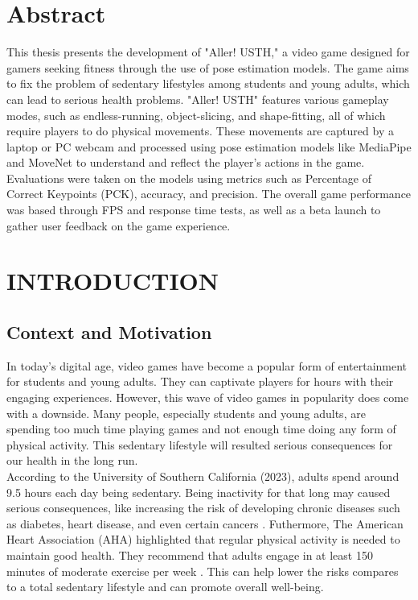 \documentclass[12pt]{article}
\begin{document}
\listoftables
{}
\clearpage

\listoffigures
{}
\clearpage

\section*{Abstract}
This thesis presents the development of "Aller! USTH," a video game designed for gamers seeking fitness through the use of pose estimation models. 
The game aims to fix the problem of sedentary lifestyles among students and young adults, which can lead to serious health problems. 
"Aller! USTH" features various gameplay modes, such as endless-running, object-slicing, and shape-fitting, all of which require players to do physical movements. 
These movements are captured by a laptop or PC webcam and processed using pose estimation models like MediaPipe and MoveNet to understand and reflect the player's actions in the game. 
Evaluations were taken on the models using metrics such as Percentage of Correct Keypoints (PCK), accuracy, and precision. 
The overall game performance was based through FPS and response time tests, as well as a beta launch to gather user feedback on the game experience.
\clearpage

\section{INTRODUCTION}
\subsection{Context and Motivation}
\hspace*{1.5em}In today's digital age, video games have become a popular form of entertainment for students and young adults. They can captivate players for hours with their engaging experiences.
However, this wave of video games in popularity does come with a downside. Many people, especially students and young adults, are spending too much time playing games and not enough time doing any form of physical activity. 
This sedentary lifestyle will resulted serious consequences for our health in the long run.\\

According to the University of Southern California (2023), adults spend around 9.5 hours each day being sedentary. 
Being inactivity for that long may caused serious consequences, like increasing the risk of developing chronic diseases such as diabetes, heart disease, and even certain cancers \cite{usc2023}.
Futhermore, The American Heart Association (AHA) highlighted that regular physical activity is needed to maintain good health. They recommend that adults engage in at least 150 minutes of moderate exercise per week \cite{aha2017}. This can help lower the risks compares to a total sedentary lifestyle and can promote overall well-being.\\
\end{document}
